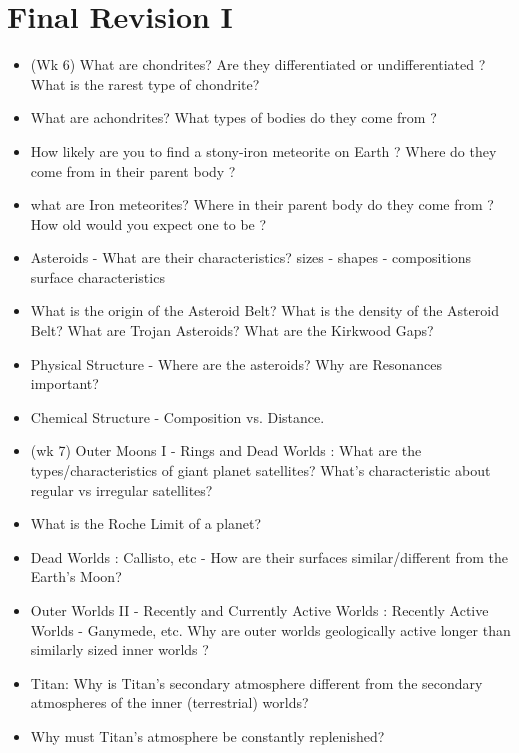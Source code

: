 \documentclass[paper=a4, fontsize=11pt]{scrartcl} %
\numberwithin{equation}{section} %
\begin{document}

\section{Final Revision I}


\begin{itemize}
\item (Wk 6)   What   are chondrites?  Are they differentiated or undifferentiated ? What is the rarest type of  chondrite? 
\item What are achondrites?  What types of bodies do they come from  ? 

\item How  likely are you to find a stony-iron meteorite   on Earth ? Where do they come from in their parent body ? 

\item what are Iron meteorites?  Where in their parent body do they come from ? How old would you expect one to be ? 

\item Asteroids - What are their characteristics? sizes - shapes - compositions surface characteristics	
\item What is the origin of the Asteroid Belt?  What is the density of the Asteroid Belt? What are Trojan Asteroids?
What are the Kirkwood Gaps?
\item Physical Structure - Where are the asteroids? Why are Resonances important?
\item Chemical Structure - Composition vs. Distance.


\item (wk 7)  Outer Moons I - Rings and Dead Worlds  : What are the types/characteristics of giant planet satellites? What's characteristic about regular vs irregular satellites?  
\item What is the Roche Limit of a planet? 
\item Dead Worlds : Callisto, etc  - How are their surfaces similar/different from the Earth's Moon?


\item Outer Worlds II - Recently and Currently Active Worlds : Recently Active Worlds - Ganymede, etc.
Why are outer worlds geologically active longer than similarly sized inner worlds ? 

\item Titan: Why is Titan's secondary atmosphere different from the secondary atmospheres of the inner  (terrestrial) worlds?
\item Why must Titan's atmosphere be constantly replenished? 


\end{itemize}
\end{document}

